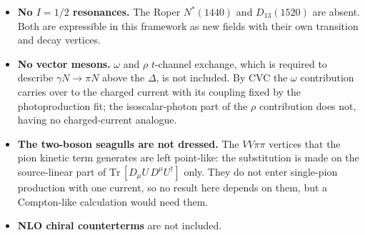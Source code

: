 \documentclass[11pt,a4paper]{article}
\begin{document}
\begin{itemize}
\item \textbf{No $I=1/2$ resonances.} The Roper $N^*(1440)$ and $D_{13}(1520)$
are absent. Both are expressible in this framework as new fields with their own
transition and decay vertices.

\item \textbf{No vector mesons.} $\omega$ and $\rho$ $t$-channel exchange, which
is required to describe $\gamma N\to\pi N$ above the $\Delta$, is not included.
By CVC the $\omega$ contribution carries over to the charged current with its
coupling fixed by the photoproduction fit; the isoscalar-photon part of the
$\rho$ contribution does not, having no charged-current analogue.

\item \textbf{The two-boson seagulls are not dressed.} The $VV\pi\pi$ vertices
that the pion kinetic term generates are left point-like: the substitution is
made on the source-linear part of $\mathrm{Tr}\,[D_\mu U\, D^\mu U^\dagger]$
only. They do not enter single-pion production with one current, so no result
here depends on them, but a Compton-like calculation would need them.

\item \textbf{NLO chiral counterterms} are not included.
\end{itemize}
\end{document}
